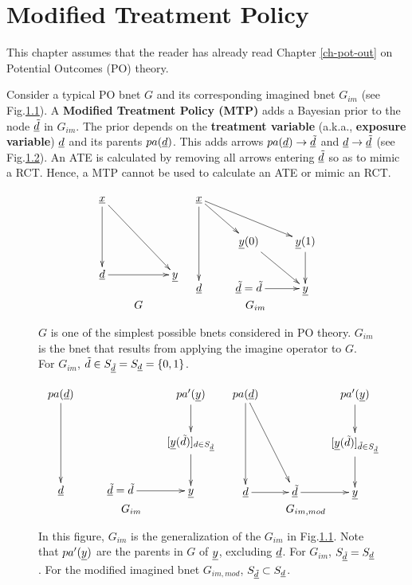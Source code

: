 \chapter{Modified Treatment Policy}
\label{ch-modi-treat}

This  chapter
assumes that the
reader has
already read
Chapter \ref{ch-pot-out} on Potential Outcomes (PO) theory.

Consider a typical PO bnet $G$
and its corresponding imagined bnet $G_{im}$ (see Fig.\ref{fig-modi-po}).
A {\bf Modified Treatment Policy (MTP)} adds a Bayesian prior to the
 node $\underline{{\tilde{d}}}$ in $G_{im}$.
The prior depends on the {\bf treatment
variable} (a.k.a., {\bf exposure variable}) ${\underline{d}}$ and its parents $pa({\underline{d}})$.
This adds arrows $pa({\underline{d}})\rightarrow\underline{{\tilde{d}}}$
and ${\underline{d}}\rightarrow \underline{{\tilde{d}}}$ (see Fig.\ref{fig-unmodi-modi}).
An ATE is calculated by removing all arrows entering $\underline{{\tilde{d}}}$
so as to mimic a RCT. Hence, a MTP cannot be used to calculate
an ATE or mimic an RCT.


\begin{figure}[h!]
$$
\begin{array}{cc}
\xymatrix{
\rvx
\ar[dd]\ar[ddrr]
\\
\\
\rvd \ar[rr]
&
&\rvy
}
&
\xymatrix{
\rvx
\ar[dd]\ar[dr] \ar[drr]
\\
& \rvy(0)\ar[dr]
&\rvy(1)\ar[d]
\\
\rvd
&\ul{\tild}=\tild\ar[r]
&\rvy
}
\\
G & G_{im}
\end{array}
$$
\caption{$G$ is one of the
simplest possible bnets considered in  PO theory.
$G_{im}$ is the bnet that results
from applying the imagine operator to $G$.
For $G_{im}$, ${\tilde{d}}\in S_{\underline{{\tilde{d}}}}=S_{\underline{d}}=\{0,1\}$.}
\label{fig-modi-po}
\end{figure}


\begin{figure}[h!]
$$
\begin{array}{cc}
\xymatrix{
pa(\rvd)
\ar[dd]
&
&pa'(\rvy)\ar[d]
\\
&&[\rvy(\tild)]_{d\in S_{\ul{\tild}}}\ar[d]
\\
\rvd
&\ul{\tild}=\tild\ar[r]
&\rvy
}
&
\xymatrix{
pa(\rvd)
\ar[dd]\ar[ddr]
&
&pa'(\rvy)\ar[d]
\\
&&[\rvy(\tild)]_{\tild\in S_{\ul{\tild}}}\ar[d]
\\
\rvd\ar[r]
&\ul{\tild}\ar[r]
&\rvy
}
\\
G_{im}
 &
G_{im,mod}
\end{array}
$$
\caption{In this figure, $G_{im}$
is the generalization of the $G_{im}$
in Fig.\ref{fig-modi-po}.
Note that $pa'({\underline{y}})$ are the parents in $G$ of
${\underline{y}}$, excluding ${\underline{d}}$.
For $G_{im}$, $S_{\underline{{\tilde{d}}}}= S_{\underline{d}}$.
For the modified
imagined bnet $G_{im,mod}$, $S_{\underline{{\tilde{d}}}}\subset S_{\underline{d}}$. }
\label{fig-unmodi-modi}
\end{figure}

